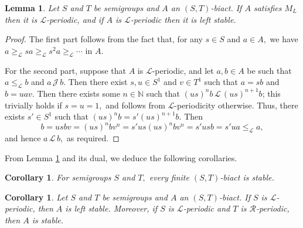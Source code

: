 \documentclass[twoside,a4paper,12pt,reqno]{amsart}
\theoremstyle{plain}
\newtheorem{cor}[thm]{Corollary}
\newtheorem{lem}[thm]{Lemma}
\theoremstyle{definition}
\newtheorem{rem}[thm]{Remark}
\renewcommand{\l}{\mbox{${\mathcal{L}}$}}
\renewcommand{\r}{\mbox{${\mathcal{R}}$}}
\renewcommand{\j}{\mbox{${\mathcal{J}}$}}
\newcommand{\leql}{\leq_{\mathcal{L}}}
\newcommand{\geql}{\geq_{\mathcal{L}}}
\newcommand{\N}{\mathbb{N}}
\begin{document}
\begin{lem}\label{lem:L-periodic}
Let $S$ and $T$ be semigroups and $A$ an $(S,T)$-biact.  If $A$ satisfies $M_L$ then it is $\l$-periodic, and if $A$ is $\l$-periodic then it is left stable.
\end{lem}

\begin{proof}
The first part follows from the fact that, for any $s\in S$ and $a\in A,$ we have $a\geql sa\geql s^2a\geql\cdots$ in $A.$

For the second part, suppose that $A$ is $\l$-periodic, and let $a,b\in A$ be such that $a\leql b$ and $a\,\j\,b.$  Then there exist $s,u\in S^1$ and $v\in T^1$ such that $a=sb$ and $b=uav.$  Then there exists some $n\in\N$ such that $(us)^nb\,\l\,(us)^{n+1}b$; this trivially holds if $s=u=1,$ and follows from $\l$-periodicity otherwise.  Thus, there exists $s'\in S^1$ such that $(us)^nb=s'(us)^{n+1}b.$  Then
$$b=usbv=(us)^nbv^n=s'us(us)^nbv^n
=s'usb=s'ua\leql a,$$
and hence $a\,\l\,b,$ as required.
\end{proof}

From Lemma \ref{lem:L-periodic} and its dual, we deduce the following corollaries.

\begin{cor}\:
For semigroups $S$ and $T,$ every finite $(S,T)$-biact is stable.
\end{cor}

\begin{cor}
Let $S$ and $T$ be semigroups and $A$ an $(S,T)$-biact.  If $S$ is $\l$-periodic, then $A$ is left stable.  Moreover, if $S$ is $\l$-periodic and $T$ is $\r$-periodic, then $A$ is stable.
\end{cor}

\end{document}
